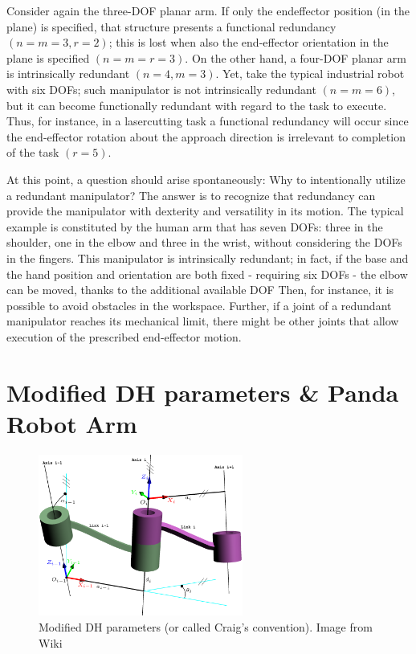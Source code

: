 \documentclass[10pt]{article}
\begin{document}
Consider again the three-DOF planar arm. If only the endeffector position (in the plane) is specified, that structure presents a functional redundancy $(n=m=3, r=2)$; this is lost when also the end-effector orientation in the plane is specified $(n=m=r=3)$. On the other hand, a four-DOF planar arm is intrinsically redundant $(n=4, m=3)$.
Yet, take the typical industrial robot with six DOFs; such manipulator is not intrinsically redundant $(n=m=6)$, but it can become functionally redundant with regard to the task to execute. Thus, for instance, in a lasercutting task a functional redundancy will occur since the end-effector rotation about the approach direction is irrelevant to completion of the task $(r=5)$.

At this point, a question should arise spontaneously: Why to intentionally utilize a redundant manipulator? The answer is to recognize that redundancy can provide the manipulator with dexterity and versatility in its motion. The typical example is constituted by the human arm that has seven DOFs: three in the shoulder, one in the elbow and three in the wrist, without considering the DOFs in the fingers. This manipulator is intrinsically redundant; in fact, if the base and the hand position and orientation are both fixed - requiring six DOFs - the elbow can be moved, thanks to the additional available DOF Then, for instance, it is possible to avoid obstacles in the workspace. Further, if a joint of a redundant manipulator reaches its mechanical limit, there might be other joints that allow execution of the prescribed end-effector motion.






\section{Modified DH parameters \& Panda Robot Arm}




\begin{figure}[H]
    \centering
    \includegraphics[max width=0.6\textwidth]{kinematics/DHParameter.png}
    \caption{Modified DH parameters (or called Craig's convention). Image from Wiki}
\end{figure}
\end{document}
